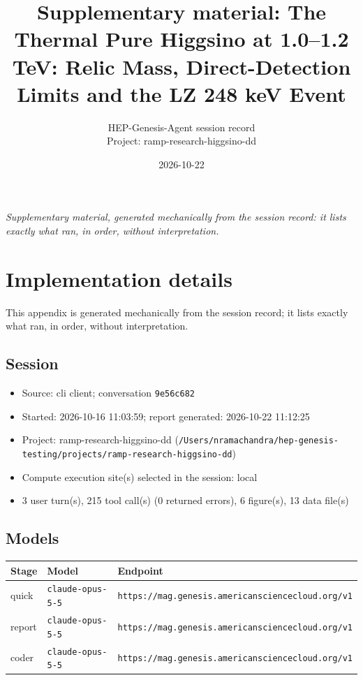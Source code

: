 \documentclass[11pt,a4paper]{article}
\title{Supplementary material: The Thermal Pure Higgsino at 1.0--1.2 TeV: Relic Mass, Direct-Detection Limits and the LZ 248 keV Event}
\author{HEP-Genesis-Agent session record \\ \small Project: ramp-research-higgsino-dd}
\date{2026-10-22}
\begin{document}
\maketitle
\noindent\textit{\small Supplementary material, generated mechanically from the session record: it lists exactly what ran, in order, without interpretation.}
\vspace{1em}



\appendix
\section{Implementation details}
\label{app:impl}
This appendix is generated mechanically from the session record; it lists exactly what ran, in order, without interpretation.
\subsection{Session}
\begin{itemize}
  \item Source: cli client; conversation \texttt{9e56c682}
  \item Started: 2026-10-16 11:03:59; report generated: 2026-10-22 11:12:25
  \item Project: ramp-research-higgsino-dd (\texttt{/\allowbreak{}Users/\allowbreak{}nramachandra/\allowbreak{}hep-genesis-testing/\allowbreak{}projects/\allowbreak{}ramp-research-higgsino-dd})
  \item Compute execution site(s) selected in the session: local
  \item 3 user turn(s), 215 tool call(s) (0 returned errors), 6 figure(s), 13 data file(s)
\end{itemize}
\subsection{Models}
\begin{longtable}{@{}p{}p{}p{}@{}}
\toprule Stage & Model & Endpoint \\ \midrule \endhead
quick & \texttt{claude-opus-5-5} & \texttt{https:\allowbreak{}/\allowbreak{}/\allowbreak{}mag.genesis.americansciencecloud.org/\allowbreak{}v1} \\
report & \texttt{claude-opus-5-5} & \texttt{https:\allowbreak{}/\allowbreak{}/\allowbreak{}mag.genesis.americansciencecloud.org/\allowbreak{}v1} \\
coder & \texttt{claude-opus-5-5} & \texttt{https:\allowbreak{}/\allowbreak{}/\allowbreak{}mag.genesis.americansciencecloud.org/\allowbreak{}v1} \\
\bottomrule\end{longtable}
\end{document}
